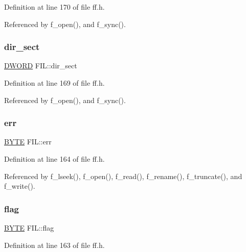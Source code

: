 Definition at line 170 of file ff.\+h.



Referenced by f\+\_\+open(), and f\+\_\+sync().

\mbox{\label{structFIL_ab203794f939ad4480e81dfa488770783}} 
\subsubsection{\texorpdfstring{dir\+\_\+sect}{dir\_sect}}
{\footnotesize\ttfamily \hyperlink{integer_8h_ad342ac907eb044443153a22f964bf0af}{D\+W\+O\+RD} F\+I\+L\+::dir\+\_\+sect}



Definition at line 169 of file ff.\+h.



Referenced by f\+\_\+open(), and f\+\_\+sync().

\mbox{\label{structFIL_aea440945db26de9c4a88065c0c887fda}} 
\subsubsection{\texorpdfstring{err}{err}}
{\footnotesize\ttfamily \hyperlink{lz4_8c_a4ae1dab0fb4b072a66584546209e7d58}{B\+Y\+TE} F\+I\+L\+::err}



Definition at line 164 of file ff.\+h.



Referenced by f\+\_\+lseek(), f\+\_\+open(), f\+\_\+read(), f\+\_\+rename(), f\+\_\+truncate(), and f\+\_\+write().

\mbox{\label{structFIL_ac409508881f5a16f2998ae675072b376}} 
\subsubsection{\texorpdfstring{flag}{flag}}
{\footnotesize\ttfamily \hyperlink{lz4_8c_a4ae1dab0fb4b072a66584546209e7d58}{B\+Y\+TE} F\+I\+L\+::flag}



Definition at line 163 of file ff.\+h.



